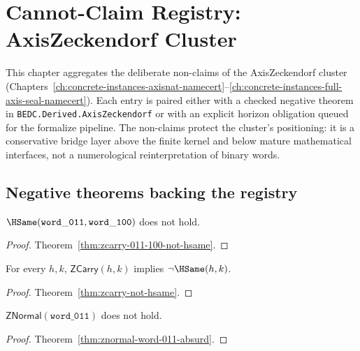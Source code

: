 \chapter{Cannot-Claim Registry: AxisZeckendorf Cluster}
\label{ch:concrete-instances-axis-zeckendorf-cannot-claim}

This chapter aggregates the deliberate non-claims of the AxisZeckendorf cluster (Chapters~\ref{ch:concrete-instances-axisnat-namecert}--\ref{ch:concrete-instances-full-axis-seal-namecert}). Each entry is paired either with a checked negative theorem in \texttt{BEDC.Derived.AxisZeckendorf} or with an explicit horizon obligation queued for the formalize pipeline. The non-claims protect the cluster's positioning: it is a conservative bridge layer above the finite kernel and below mature mathematical interfaces, not a numerological reinterpretation of binary words.

\section{Negative theorems backing the registry}

\begin{theorem}
\label{thm:cannot-claim-011-is-infinity}
\(\HSame(\mathtt{word\_011}, \mathtt{word\_100})\) does not hold.
\end{theorem}
\begin{proof}
Theorem~\ref{thm:zcarry-011-100-not-hsame}.
\end{proof}

\begin{theorem}
\label{thm:cannot-claim-carry-is-hsame}
For every \(h, k\), \(\mathsf{ZCarry}(h, k)\) implies \(\neg \HSame(h, k)\).
\end{theorem}
\begin{proof}
Theorem~\ref{thm:zcarry-not-hsame}.
\end{proof}

\begin{theorem}
\label{thm:cannot-claim-011-is-normal}
\(\mathsf{ZNormal}(\mathtt{word\_011})\) does not hold.
\end{theorem}
\begin{proof}
Theorem~\ref{thm:znormal-word-011-absurd}.
\end{proof}

